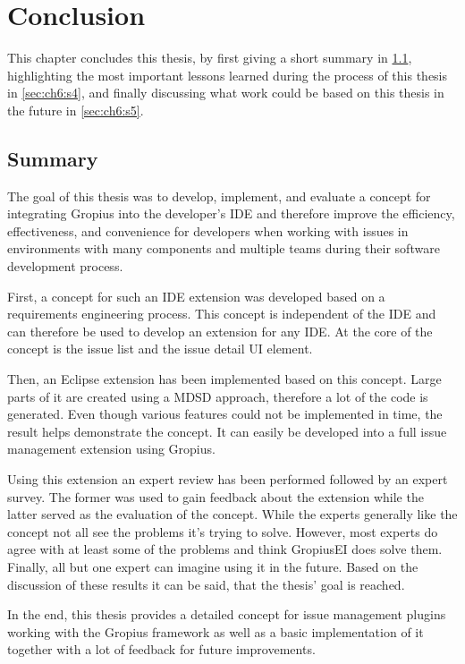 
\chapter{Conclusion}
\label{chap:ch6}
This chapter concludes this thesis, by first giving a short summary in \cref{sec:ch6:s1}, highlighting the most important lessons learned during the process of this thesis in \cref{sec:ch6:s4}, and finally discussing what work could be based on this thesis in the future in \cref{sec:ch6:s5}.

\section{Summary}
\label{sec:ch6:s1}
The goal of this thesis was to develop, implement, and evaluate a concept for integrating \gls{Gropius} into the developer's \gls{IDE} and therefore improve the efficiency, effectiveness, and convenience for developers when working with issues in environments with many components and multiple teams during their software development process.

First, a concept for such an \gls{IDE} extension was developed based on a requirements engineering process.
This concept is independent of the \gls{IDE} and can therefore be used to develop an extension for any \gls{IDE}.
At the core of the concept is the issue list and the issue detail \gls{UI} element.

Then, an \gls{Eclipse} extension has been implemented based on this concept.
Large parts of it are created using a \gls{MDSD} approach, therefore a lot of the code is generated.
Even though various features could not be implemented in time, the result helps demonstrate the concept.
It can easily be developed into a full issue management extension using \gls{Gropius}.

Using this extension an expert review has been performed followed by an expert survey.
The former was used to gain feedback about the extension while the latter served as the evaluation of the concept.
While the experts generally like the concept not all see the problems it's trying to solve.
However, most experts do agree with at least some of the problems and think \gls{GropiusEI} does solve them.
Finally, all but one expert can imagine using it in the future.
Based on the discussion of these results it can be said, that the thesis' goal is reached.

In the end, this thesis provides a detailed concept for issue management plugins working with the \gls{Gropius} framework as well as a basic implementation of it together with a lot of feedback for future improvements.

